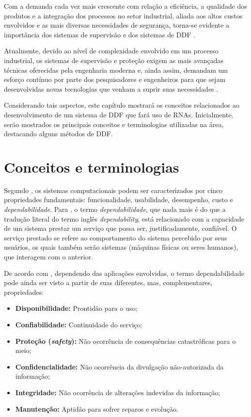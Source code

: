 \label{cap:detec_diag}

Com a demanda cada vez mais crescente com relação a eficiência, a qualidade dos
produtos e a integração dos processos no setor industrial, aliada aos altos
custos envolvidos e as mais diversas necessidades de segurança, torna-se
evidente a importância dos sistemas de supervisão e dos sistemas de DDF
\cite{isermann:2006}.

Atualmente, devido ao nível de complexidade envolvido em um processo industrial,
os sistemas de supervisão e proteção exigem as mais avançadas técnicas
oferecidas pela engenharia moderna e, ainda assim, demandam um esforço contínuo
por parte dos pesquisadores e engenheiros para que sejam desenvolvidas novas
tecnologias que venham a suprir suas necessidades \cite{silva:2008}.

Considerando tais aspectos, este capítulo mostrará os conceitos relacionados ao
desenvolvimento de um sistema de DDF que fará uso de RNAs. Inicialmente, serão
mostrados os principais conceitos e terminologias utilizadas na área, destacando
alguns métodos de DDF.

\section{Conceitos e terminologias}\label{sec:propriedades}
Segundo , os sistemas computacionais podem ser
caracterizados por cinco propriedades fundamentais: funcionalidade, usabilidade,
desempenho, custo e {\it dependabilidade}. Para , o
termo {\it dependabilidade}, que nada mais é do que a tradução literal do termo
inglês {\it dependability}, está relacionado com a capacidade de um sistema
prestar um serviço que possa ser, justificadamente, confiável. O serviço
prestado se refere ao comportamento do sistema percebido por seus usuários, os
quais também serão sistemas (máquinas físicas ou seres humanos), que interagem
com o anterior.

De acordo com , dependendo das aplicações envolvidas, o
termo dependabilidade pode ainda ser visto a partir de suas diferentes, mas,
complementares, propriedades:

\begin{itemize}
    \item {\bf Disponibilidade:} Prontidão para o uso;
    \item {\bf Confiabilidade:} Continuidade do serviço;
    \item \textbf{Proteção (\textit{safety}):} Não ocorrência de consequências
          catastróficas para o meio;
    \item {\bf Confidencialidade:} Não ocorrência da divulgação não-autorizada
          da informação;
    \item {\bf Integridade:} Não ocorrência de alterações indevidas da
          informação;
    \item {\bf Manutenção:} Aptidão para sofrer reparos e evolução.
\end{itemize}

